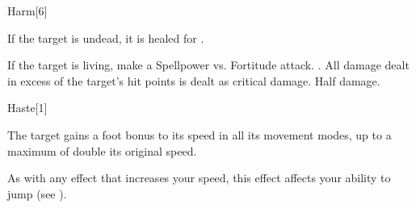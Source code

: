 
\begin{spellsection}{Harm}[6]
    \begin{spellheader}
    \end{spellheader}
    \begin{spellcontent}
        \begin{spelltargetinginfo}
        \end{spelltargetinginfo}
        \begin{spelleffects}
            \spelleffect If the target is undead, it is healed for \spelldamage{}.
            \begin{spellattacktriggered}{If the target is living, make a Spellpower vs. Fortitude attack.}
                \spellsuccess {}. All damage dealt in excess of the target's hit points is dealt as critical damage.
                \spellfailure Half damage.
            \end{spellattacktriggered}
        \end{spelleffects}
    \end{spellcontent}
    \begin{spellfooter}
        \miscastrandom
    \end{spellfooter}
\end{spellsection}

\begin{spellsection}[Lesser]{Haste}[1]
    \begin{spellheader}
    \end{spellheader}
    \begin{spellcontent}
        \begin{spelltargetinginfo}
        \end{spelltargetinginfo}
        \begin{spelleffects}
            \spelleffect The target gains a  foot bonus to its speed in all its movement modes, up to a maximum of double its original speed.
            \spelldur \durshort \dismissable
        \end{spelleffects}
    \end{spellcontent}
    \begin{spellfooter}
        \spellnotes As with any effect that increases your speed, this effect affects your ability to jump (see ).
        \miscastrandom
    \end{spellfooter}
\end{spellsection}

